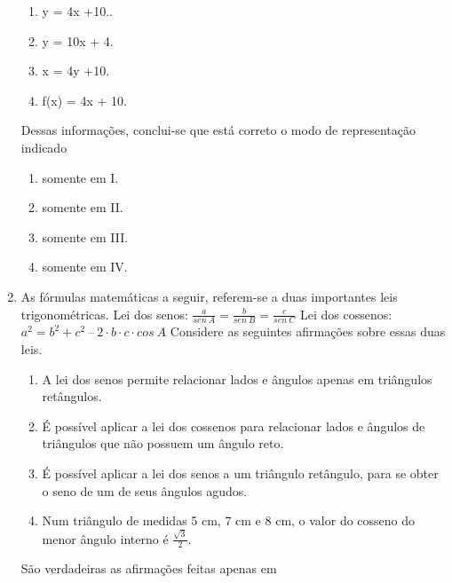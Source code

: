 \documentclass[a4paper,14pt]{article}
\begin{document}
\begin{enumerate}
        \begin{enumerate}[label=\Roman*.]
        	\item y = 4x +10..
        	\item y = 10x + 4.
        	\item x = 4y +10.
        	\item f(x) = 4x + 10.
        \end{enumerate}
        
        Dessas informações, conclui-se que está correto o modo de representação indicado
        
        \begin{enumerate}
        	\item somente em I.
        	\item somente em II. 
        	\item somente em III.
        	\item somente em IV.
        \end{enumerate}
    
        \item As fórmulas matemáticas a seguir, referem-se a duas importantes leis trigonométricas.
        \newline
        \newline
        Lei dos senos: $\frac{a}{sen~A} = \frac{b}{sen~B} = \frac{c}{sen~C}$
        \newline
        \newline
        Lei dos cossenos: $a^2 = b^2 + c^2~–~2 \cdot b \cdot c \cdot cos~A$
        \newline
        Considere as seguintes afirmações sobre essas duas leis. 
        
        \begin{enumerate}[label=\Roman*.]
        	\item A lei dos senos permite relacionar lados e ângulos apenas em triângulos retângulos.
        	\item É possível aplicar a lei dos cossenos para relacionar lados e ângulos de triângulos que não possuem
        	um ângulo reto.
        	\item É possível aplicar a lei dos senos a um triângulo retângulo, para se obter o seno de um de seus
        	ângulos agudos.
        	\item Num triângulo de medidas 5 cm, 7 cm e 8 cm, o valor do cosseno do menor ângulo interno é  $\frac{\sqrt{3}}{2}$.
        \end{enumerate}
    	São verdadeiras as afirmações feitas apenas em
    

\end{enumerate}
\end{document}
